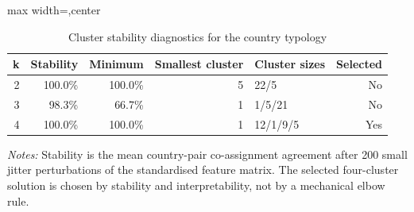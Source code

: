 \begin{table}[H]
\centering
\scriptsize
\caption{Cluster stability diagnostics for the country typology}
\label{tab:app_country_typology_cluster_stability}
\begin{adjustbox}{max width=\textwidth,center}
\begin{tabular}{@{}rrrrlr@{}}
\toprule
k & Stability & Minimum & Smallest cluster & Cluster sizes & Selected \\
\midrule
2 & 100.0\% & 100.0\% & 5 & 22/5 & No \\
3 &  98.3\% &  66.7\% & 1 & 1/5/21 & No \\
4 & 100.0\% & 100.0\% & 1 & 12/1/9/5 & Yes \\
\bottomrule
\end{tabular}
\end{adjustbox}

\vspace{0.5em}
\begin{minipage}{0.96\textwidth}
\footnotesize\raggedright \textit{Notes:} Stability is the mean country-pair co-assignment agreement after 200 small jitter perturbations of the standardised feature matrix. The selected four-cluster solution is chosen by stability and interpretability, not by a mechanical elbow rule.
\end{minipage}
\end{table}
